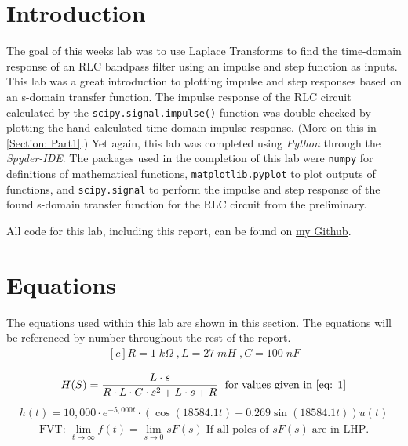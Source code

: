 \documentclass[12pt]{report}
\begin{document}
\section{Introduction}
The goal of this weeks lab was to use Laplace Transforms to find the time-domain response of an RLC bandpass filter using an impulse and step function as inputs.
This lab was a great introduction to plotting impulse and step responses based on an s-domain transfer function. The impulse response of the RLC circuit calculated
by the \texttt{scipy.signal.impulse()} function was double checked by plotting the hand-calculated time-domain impulse response. (More on this in \ref{Section: Part1}.)
Yet again, this lab was completed using \textit{Python} through the \textit{Spyder-IDE}. The packages used in the completion of this lab were \texttt{numpy} for 
definitions of mathematical functions, \texttt{matplotlib.pyplot} to plot outputs of functions, and \texttt{scipy.signal} to perform the impulse and step response of the
found s-domain transfer function for the RLC circuit from the preliminary.

All code for this lab, including this report, can be found on \href{http://github.com/mac-edmondson}{my Github}.
\section{Equations}\label{section: eq}
The equations used within this lab are shown in this section. The equations will be referenced by number throughout the rest of the report.
\begin{equation}\label{eq: 1}
  \begin{aligned}[c]
    R = 1\;k\Omega\; , L = 27\;mH\; , C = 100\;nF\\
  \end{aligned}
\end{equation}
\begin{equation}\label{eq: 2}
  \begin{aligned}[c]
    H(S) = \frac{L\cdot s}{R\cdot L\cdot C\cdot s^2 + L\cdot s + R} \; \textrm{ for values given in \eqref{eq: 1}}
  \end{aligned}
\end{equation}
\begin{equation}\label{eq: 3}
  \begin{aligned}
    h(t) = 10,000\cdot e^{-5,000t}\cdot (\cos{(18584.1t)} - 0.269\sin{(18584.1t)})u(t)
  \end{aligned}
\end{equation}
\begin{equation}\label{eq: 4}
  \begin{aligned}
    \textrm{FVT: } \lim_{t\to\infty} f(t) = \lim_{s\to 0} sF(s) \;\textrm{If all poles of } sF(s) \; \textrm{are in LHP.}
  \end{aligned}
\end{equation}
\end{document}
